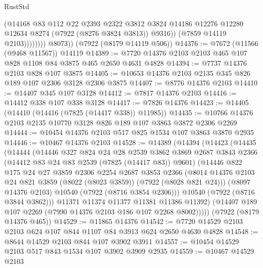\begin{lexlean}{RustStd}
\begin{coremodule}
                        (@14168
                          @83
                          @112
                          @22
                          @2393
                          @2322
                          @3812
                          @3824
                          @14186
                          @12276
                          @12280
                          @12634
                          @8274
                          (@7922 (@8276 @3824 @3813))
                          @9316))
                      (@7859 @14119 @2103))))))))
        @8073))
    (@7922 (@8179 @14119 @506))
@14376 := @7672 (@11566 (@9468 @11567)) @14119
@14389 := @7720 @14376 @2103 @2103 @465 @107 @828 @1108 @84 @3875 @465 @2650 @4631 @4828
@14394 := @7737 @14376 @2103 @828 @107 @3875
@14405 := @10653 @14376 @2103 @2135 @345 @826 @189 @107 @2306 @3128 @2306 @3875
@14407 := @8776 @14376 @2103
@14410 := @14407 @345 @107 @3128
@14412 := @7817 @14376 @2103
@14416 := @14412 @338 @107 @338 @3128
@14417 := @7826 @14376
@14423 := @14405 (@14410 (@14416 (@7825 (@14417 @338)) @11985))
@14435 := @10766 @14376 @2103 @2135 @10770 @3128 @826 @189 @107 @3863 @3872 @2306 @2269
@14444 := @10454 @14376 @2103 @517 @825 @1534 @107 @3863 @3870 @2935
@14446 := @10467 @14376 @2103
@14528 := @14389
    (@14394
      (@14423
        (@14435
          (@14444
            (@14446
              @327
              @824
              @24
              @28
              @2539
              @3862
              @3869
              @2687
              @3843
              @2366
              (@14412 @83 @24 @83 @2539 (@7825 (@14417 @83)) @9601)
              (@14446
                @822
                @175
                @24
                @27
                @3859
                @2306
                @2254
                @2687
                @3853
                @2366
                (@8014 @14376 @2103 @24 @821 @3859 (@8022 (@8023 @3859)) (@7922 (@8028 @821 @24)))
                (@8097 @14376 @2103)
                @10540
                (@7922 (@8716 @3854 @2306)))
              @10540
              (@7922 (@8716 @3844 @3862)))
            @11371
            @11374
            @11377
            @11381
            @11386
            @11392)
          (@14407 @189 @107 @2269 (@7990 @14376 @2103 @186 @107 @2268 @8002)))))
    (@7922 (@8179 @14376 @465))
@14529 := @11865 @14376
@14542 := @7720 @14529 @2103 @2103 @624 @107 @844 @1107 @84 @3913 @624 @2650 @4630 @4828
@14548 := @8644 @14529 @2103 @844 @107 @3902 @3911
@14557 := @10454 @14529 @2103 @517 @843 @1534 @107 @3902 @3909 @2935
@14559 := @10467 @14529 @2103

\end{coremodule}
\end{lexlean}
